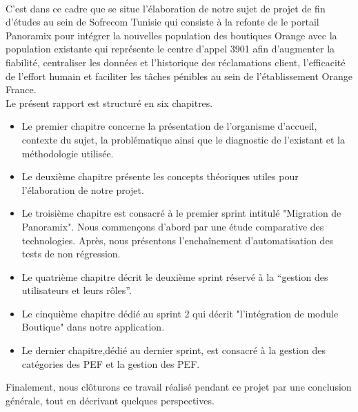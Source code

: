 \\\newline
C’est dans ce cadre que se situe l’élaboration de notre sujet de projet de fin d’études au sein de Sofrecom Tunisie qui consiste à la refonte de le portail Panoramix pour intégrer la nouvelles population des boutiques Orange avec la population existante qui représente le centre d’appel 3901 afin d’augmenter la fiabilité, centraliser les données et l'historique des réclamations client, l’efficacité de l’effort humain et faciliter les tâches pénibles au sein de l’établissement Orange France.\\ \newline
Le présent rapport est structuré en six chapitres.
\begin{itemize}
	\item Le premier chapitre concerne la présentation de l'organisme d’accueil, contexte du sujet, la problématique ainsi que le diagnostic de l’existant et la méthodologie utilisée.
	\item Le deuxième chapitre présente les concepts théoriques utiles pour l’élaboration de notre projet.
	\item Le troisième chapitre est consacré à le premier sprint intitulé "Migration de Panoramix". Nous commençons d’abord par une étude comparative des technologies. Après, nous présentons l'enchaînement d’automatisation des tests de non régression.
	\item Le quatrième chapitre décrit le deuxième sprint réservé à la “gestion des utilisateurs et leurs rôles”.
	\item Le  cinquième chapitre  dédié au sprint 2 qui décrit "l’intégration de module Boutique" dans notre application.
	\item Le dernier chapitre,dédié au dernier sprint, est consacré à la gestion des catégories des PEF et la gestion des PEF.
\end{itemize}
Finalement, nous clôturons ce travail réalisé pendant ce projet par une conclusion générale, tout en décrivant quelques perspectives.
